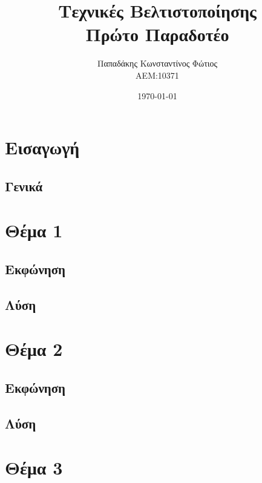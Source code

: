 \documentclass[twocolumn]{report}
\begin{document}
\title{\Huge \bfseries Τεχνικές Βελτιστοποίησης \\ Πρώτο Παραδοτέο} %
\author{Παπαδάκης Κωνσταντίνος Φώτιος\vspace{0.5cm} \\  ΑΕΜ:10371} %
\date{\today}
\maketitle

\tableofcontents

\chapter{Εισαγωγή}
\section{Γενικά}


\chapter{Θέμα 1}
\section{Εκφώνηση}

\section{Λύση}


\chapter{Θέμα 2}
\section{Εκφώνηση}

\section{Λύση}


\chapter{Θέμα 3}
\end{document}
